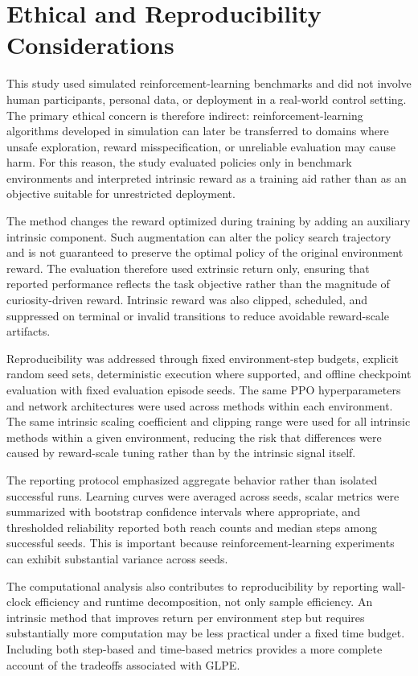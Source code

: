 \section{Ethical and Reproducibility Considerations}
\label{sec:methodology_ethical_and_reproducibility_considerations}

This study used simulated reinforcement-learning benchmarks and did not involve human participants, personal data, or deployment in a real-world control setting.
The primary ethical concern is therefore indirect: reinforcement-learning algorithms developed in simulation can later be transferred to domains where unsafe exploration, reward misspecification, or unreliable evaluation may cause harm.
For this reason, the study evaluated policies only in benchmark environments and interpreted intrinsic reward as a training aid rather than as an objective suitable for unrestricted deployment.

The method changes the reward optimized during training by adding an auxiliary intrinsic component.
Such augmentation can alter the policy search trajectory and is not guaranteed to preserve the optimal policy of the original environment reward.
The evaluation therefore used extrinsic return only, ensuring that reported performance reflects the task objective rather than the magnitude of curiosity-driven reward.
Intrinsic reward was also clipped, scheduled, and suppressed on terminal or invalid transitions to reduce avoidable reward-scale artifacts.

Reproducibility was addressed through fixed environment-step budgets, explicit random seed sets, deterministic execution where supported, and offline checkpoint evaluation with fixed evaluation episode seeds.
The same PPO hyperparameters and network architectures were used across methods within each environment.
The same intrinsic scaling coefficient and clipping range were used for all intrinsic methods within a given environment, reducing the risk that differences were caused by reward-scale tuning rather than by the intrinsic signal itself.

The reporting protocol emphasized aggregate behavior rather than isolated successful runs.
Learning curves were averaged across seeds, scalar metrics were summarized with bootstrap confidence intervals where appropriate, and thresholded reliability reported both reach counts and median steps among successful seeds.
This is important because reinforcement-learning experiments can exhibit substantial variance across seeds.

The computational analysis also contributes to reproducibility by reporting wall-clock efficiency and runtime decomposition, not only sample efficiency.
An intrinsic method that improves return per environment step but requires substantially more computation may be less practical under a fixed time budget.
Including both step-based and time-based metrics provides a more complete account of the tradeoffs associated with GLPE.